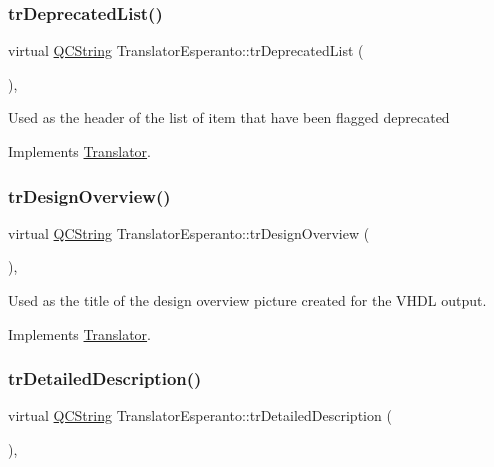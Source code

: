 \subsubsection{\texorpdfstring{trDeprecatedList()}{trDeprecatedList()}}
{\footnotesize\ttfamily virtual \mbox{\hyperlink{class_q_c_string}{Q\+C\+String}} Translator\+Esperanto\+::tr\+Deprecated\+List (\begin{DoxyParamCaption}{ }\end{DoxyParamCaption})\hspace{0.3cm}{\ttfamily [inline]}, {\ttfamily [virtual]}}

Used as the header of the list of item that have been flagged deprecated 

Implements \mbox{\hyperlink{class_translator}{Translator}}.

\mbox{\label{class_translator_esperanto_a3a86c34d416f0357cc44c8592852da5d}} 
\subsubsection{\texorpdfstring{trDesignOverview()}{trDesignOverview()}}
{\footnotesize\ttfamily virtual \mbox{\hyperlink{class_q_c_string}{Q\+C\+String}} Translator\+Esperanto\+::tr\+Design\+Overview (\begin{DoxyParamCaption}{ }\end{DoxyParamCaption})\hspace{0.3cm}{\ttfamily [inline]}, {\ttfamily [virtual]}}

Used as the title of the design overview picture created for the V\+H\+DL output. 

Implements \mbox{\hyperlink{class_translator}{Translator}}.

\mbox{\label{class_translator_esperanto_a5bb25f0469f6b11aba1fe557853d4c3f}} 
\subsubsection{\texorpdfstring{trDetailedDescription()}{trDetailedDescription()}}
{\footnotesize\ttfamily virtual \mbox{\hyperlink{class_q_c_string}{Q\+C\+String}} Translator\+Esperanto\+::tr\+Detailed\+Description (\begin{DoxyParamCaption}{ }\end{DoxyParamCaption})\hspace{0.3cm}{\ttfamily [inline]}, {\ttfamily [virtual]}}

